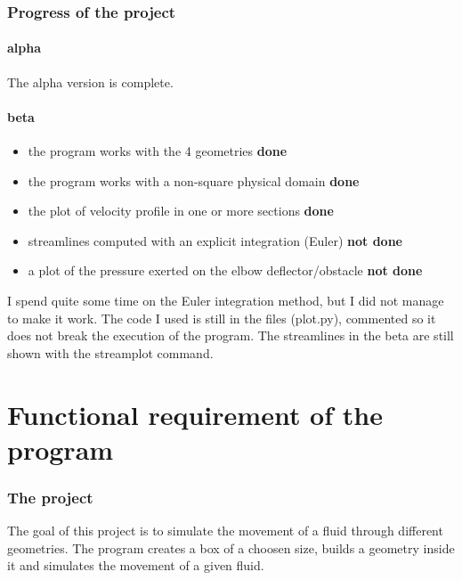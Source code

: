 \section{Progress of the project}
\subsection{alpha}
The alpha version is complete.
\subsection{beta}
\begin{itemize}
      \item the program works with the 4 geometries \hfill \textbf{done}
      \item the program works with a non-square physical domain \hfill \textbf{done}
      \item the plot of velocity profile in one or more sections \hfill \textbf{done}
      \item streamlines computed with an explicit integration (Euler) \hfill \textbf{not done}
      \item a plot of the pressure exerted on the elbow deflector/obstacle \hfill \textbf{not done}
\end{itemize}

I spend quite some time on the Euler integration method, but I did not manage
to make it work. The code I used is still in the files (plot.py), commented so
it does not break the execution of the program. The streamlines in the beta are
still shown with the streamplot command.

\newpage
\part{Functional requirement of the program}
\section{The project}
The goal of this project is to simulate the movement of a fluid through
different geometries. The program creates a box of a choosen size, builds a
geometry inside it and simulates the movement of a given fluid.
